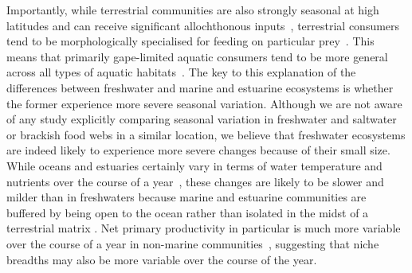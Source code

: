 \documentclass[12pt]{article}
\begin{document}
  Importantly, while terrestrial communities are also strongly seasonal at
  high latitudes and can receive significant allochthonous
  inputs~\cite{Nakano2001}, terrestrial consumers tend to be
  morphologically specialised for feeding on particular prey~\cite{Liem1990}.
  This means that primarily gape-limited aquatic consumers tend to be more
  general across all types of aquatic habitats~\cite{Liem1990,Shurin2006}. The
  key to this explanation of the differences between freshwater and
  marine and estuarine  ecosystems is whether the former experience more
  severe seasonal variation. Although we are not aware of any study explicitly
  comparing seasonal variation in freshwater and saltwater or brackish food
  webs in a similar location, we believe that freshwater ecosystems are indeed
  likely to  experience more severe changes because of their small size. While
  oceans and estuaries certainly vary in terms of water temperature and
  nutrients over the course of a year~\cite{Baird1989}, these changes are likely to be slower
  and milder than in freshwaters because marine and estuarine communities are buffered 
  by being open to the ocean rather than isolated
  in the midst of a terrestrial matrix . Net primary productivity in particular is
  much more variable over the course of a year in non-marine communities~\cite{Field1998},
  suggesting that niche breadths may also be more variable over the course of the year.



\end{document}
